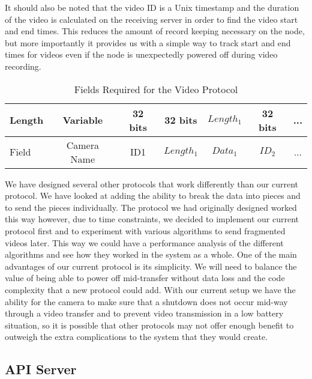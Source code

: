It should also be noted that the video ID is a Unix timestamp and the duration
of the video is calculated on the receiving server in order to find the video
start and end times.  This reduces the amount of record keeping necessary on the
node, but more importantly it provides us with a simple way to track start and
end times for videos even if the node is unexpectedly powered off during video
recording.

\begin{table}[!t]
\renewcommand{\arraystretch}{1.3}
\caption{Fields Required for the Video Protocol}
\label{video_protocol}
\centering

\begin{tabular}{ | l || c | c | c | c | c | c |}
    \hline  
    Length & Variable & 32 bits & 32 bits & $Length_1$ & 32 bits & ...\\
    \hline                       
    Field & Camera Name & ID{1} & $Length_1$ & $Data_1$ & $ID_2$ & ...\\
    \hline  
\end{tabular}

\end{table}


We have designed several other protocols that work differently than our current
protocol. We have looked at adding the ability to break the data into pieces and
to send the pieces individually. The protocol we had originally designed worked
this way however, due to time constraints, we decided to implement our current
protocol first and to experiment with various algorithms to send fragmented
videos later. This way we could have a performance analysis of the different
algorithms and see how they worked in the system as a whole. One of the main
advantages of our current protocol is its simplicity. We will need to balance
the value of being able to power off mid-transfer without data loss and the code
complexity that a new protocol could add. With our current setup we have the
ability for the camera to make sure that a shutdown does not occur mid-way
through a video transfer and to prevent video transmission in a low battery
situation, so it is possible that other protocols may not offer enough benefit
to outweigh the extra complications to the system that they would create.

\subsection{API Server}

